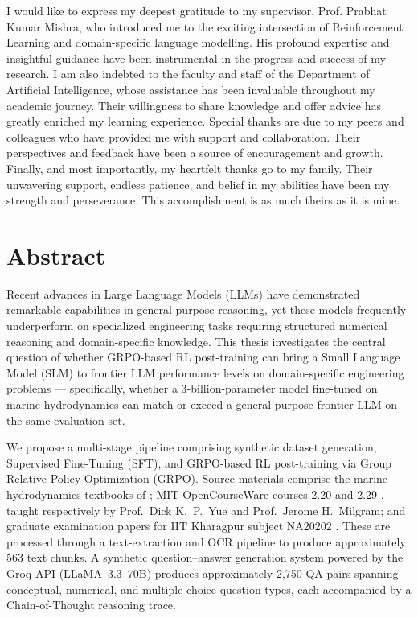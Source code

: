 \documentclass[12pt]{report}
\begin{document}
I would like to express my deepest gratitude to my supervisor, Prof. Prabhat Kumar Mishra, who introduced me to the exciting intersection of Reinforcement Learning and domain-specific language modelling. His profound expertise and insightful guidance have been instrumental in the progress and success of my research. I am also indebted to the faculty and staff of the Department of Artificial Intelligence, whose assistance has been invaluable throughout my academic journey. Their willingness to share knowledge and offer advice has greatly enriched my learning experience. Special thanks are due to my peers and colleagues who have provided me with support and collaboration. Their perspectives and feedback have been a source of encouragement and growth. Finally, and most importantly, my heartfelt thanks go to my family. Their unwavering support, endless patience, and belief in my abilities have been my strength and perseverance. This accomplishment is as much theirs as it is mine.

\chapter*{Abstract}

Recent advances in Large Language Models (LLMs) have demonstrated remarkable capabilities in general-purpose reasoning, yet these models frequently underperform on specialized engineering tasks requiring structured numerical reasoning and domain-specific knowledge. This thesis investigates the central question of whether GRPO-based RL post-training can bring a Small Language Model (SLM) to frontier LLM performance levels on domain-specific engineering problems --- specifically, whether a 3-billion-parameter model fine-tuned on marine hydrodynamics can match or exceed a general-purpose frontier LLM on the same evaluation set.

We propose a multi-stage pipeline comprising synthetic dataset generation, Supervised Fine-Tuning (SFT), and GRPO-based RL post-training via Group Relative Policy Optimization (GRPO). Source materials comprise the marine hydrodynamics textbooks of \citet{newman1977marine,faltinsen1993sea}; MIT OpenCourseWare courses 2.20 and 2.29 \citep{mitocw220,mitocw229}, taught respectively by Prof.\ Dick K.~P.~Yue and Prof.\ Jerome H.~Milgram; and graduate examination papers for IIT Kharagpur subject NA20202 \citep{iitkgp_na20202_exams}. These are processed through a text-extraction and OCR pipeline to produce approximately 563 text chunks. A synthetic question--answer generation system powered by the Groq API (LLaMA~3.3~70B) produces approximately 2,750 QA pairs spanning conceptual, numerical, and multiple-choice question types, each accompanied by a Chain-of-Thought reasoning trace.
\end{document}
